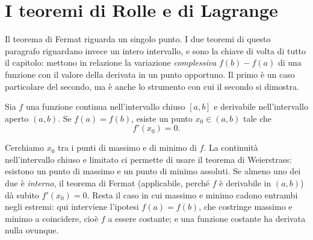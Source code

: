 \section{I teoremi di Rolle e di Lagrange}
\label{sec:rolle-lagrange}

Il teorema di Fermat riguarda un singolo punto. I due teoremi di questo paragrafo
riguardano invece un intero intervallo, e sono la chiave di volta di tutto il capitolo:
mettono in relazione la variazione \emph{complessiva} $f(b)-f(a)$ di una funzione con
il valore della derivata in un punto opportuno. Il primo è un caso particolare del
secondo, ma è anche lo strumento con cui il secondo si dimostra.

\begin{teorema}[di Rolle]\label{teo:rolle}
Sia $f$ una funzione continua nell'intervallo chiuso $[a,b]$ e derivabile
nell'intervallo aperto $(a,b)$. Se $f(a)=f(b)$, esiste un punto $x_{0}\in(a,b)$ tale
che
\begin{equation}\label{eq:rolle}
  f'(x_{0})=0 .
\end{equation}
\end{teorema}

\begin{schema}
\end{schema}

\begin{strategia}
Cerchiamo $x_{0}$ tra i punti di massimo e di minimo di $f$. La continuità
nell'intervallo chiuso e limitato ci permette di usare il teorema di Weierstrass: esistono
un punto di massimo e un punto di minimo assoluti. Se almeno uno dei due è
\emph{interno}, il teorema di Fermat (applicabile, perché $f$ è derivabile in $(a,b)$)
dà subito $f'(x_{0})=0$. Resta il caso in cui massimo e minimo cadono entrambi negli
estremi: qui interviene l'ipotesi $f(a)=f(b)$, che costringe massimo e minimo a
coincidere, cioè $f$ a essere costante; e una funzione costante ha derivata nulla
ovunque.
\end{strategia}


